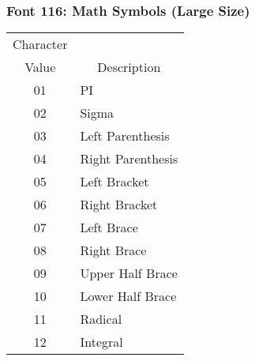 \subsubsection{Font 116: Math Symbols (Large Size)}
\begin{tabular}{|c|l|}
\hline
\multicolumn{1}{|c|}{Character}&\\
\multicolumn{1}{|c|}{Value}
&\multicolumn{1}{|c|}{Description}\\
\hline
01 & PI\\
02 & Sigma\\
03 & Left Parenthesis\\
04 & Right Parenthesis\\
05 & Left Bracket\\
06 & Right Bracket\\
07 & Left Brace\\
08 & Right Brace\\
09 & Upper Half Brace\\
10 & Lower Half Brace\\
11 & Radical\\
12 & Integral\\ \hline
\end{tabular}
\newpage

